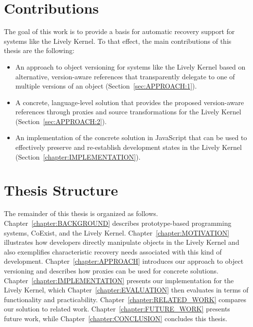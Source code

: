 \section{Contributions}

The goal of this work is to provide a basis for automatic recovery support for systems like the Lively Kernel.
To that effect, the main contributions of this thesis are the following:

\begin{itemize}
    \item An approach to object versioning for systems like the Lively Kernel based on alternative, version-aware references that transparently delegate to one of multiple versions of an object (Section~\ref{sec:APPROACH:1}).
    \item A concrete, language-level solution that provides the proposed version-aware references through proxies and source transformations for the Lively Kernel (Section~\ref{sec:APPROACH:2}).
    \item An implementation of the concrete solution in JavaScript that can be used to effectively preserve and re-establish development states in the Lively Kernel (Section~\ref{chapter:IMPLEMENTATION}).
\end{itemize}


\section{Thesis Structure}

The remainder of this thesis is organized as follows. 
Chapter~\ref{chapter:BACKGROUND} describes prototype-based programming systems, CoExist, and the Lively Kernel.
Chapter~\ref{chapter:MOTIVATION} illustrates how developers directly manipulate objects in the Lively Kernel and also exemplifies characteristic recovery needs associated with this kind of development.
Chapter~\ref{chapter:APPROACH} introduces our approach to object versioning and describes how proxies can be used for concrete solutions.
Chapter~\ref{chapter:IMPLEMENTATION} presents our implementation for the Lively Kernel, which Chapter~\ref{chapter:EVALUATION} then evaluates in terms of functionality and practicability.
Chapter~\ref{chapter:RELATED_WORK} compares our solution to related work.
Chapter~\ref{chapter:FUTURE_WORK} presents future work, while Chapter~\ref{chapter:CONCLUSION} concludes this thesis.

